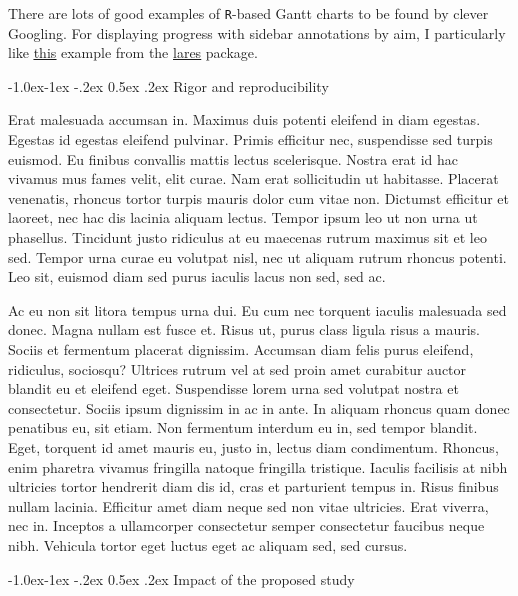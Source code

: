\documentclass[11pt,]{article}
\makeatletter
\renewcommand\subsubsection{
  \@startsection{subsubsection}{3}{\z@}
    {-1.0ex\@plus -1ex \@minus -.2ex}%
    {0.5ex \@plus .2ex}%
    {\normalfont\normalsize\bf}} %
\makeatother
\begin{document}
There are lots of good examples of \texttt{R}-based Gantt charts to be
found by clever Googling. For displaying progress with sidebar
annotations by aim, I particularly like
\href{https://datascienceplus.com/visualize-your-cvs-timeline-with-r-gantt-style/}{\underline{this}}
example from the
\href{https://github.com/laresbernardo/lares}{\underline{lares}}
package.

\hypertarget{rigor-and-reproducibility}{%
\subsubsection{Rigor and
reproducibility}\label{rigor-and-reproducibility}}

Erat malesuada accumsan in. Maximus duis potenti eleifend in diam
egestas. Egestas id egestas eleifend pulvinar. Primis efficitur nec,
suspendisse sed turpis euismod. Eu finibus convallis mattis lectus
scelerisque. Nostra erat id hac vivamus mus fames velit, elit curae. Nam
erat sollicitudin ut habitasse. Placerat venenatis, rhoncus tortor
turpis mauris dolor cum vitae non. Dictumst efficitur et laoreet, nec
hac dis lacinia aliquam lectus. Tempor ipsum leo ut non urna ut
phasellus. Tincidunt justo ridiculus at eu maecenas rutrum maximus sit
et leo sed. Tempor urna curae eu volutpat nisl, nec ut aliquam rutrum
rhoncus potenti. Leo sit, euismod diam sed purus iaculis lacus non sed,
sed ac.

Ac eu non sit litora tempus urna dui. Eu cum nec torquent iaculis
malesuada sed donec. Magna nullam est fusce et. Risus ut, purus class
ligula risus a mauris. Sociis et fermentum placerat dignissim. Accumsan
diam felis purus eleifend, ridiculus, sociosqu? Ultrices rutrum vel at
sed proin amet curabitur auctor blandit eu et eleifend eget. Suspendisse
lorem urna sed volutpat nostra et consectetur. Sociis ipsum dignissim in
ac in ante. In aliquam rhoncus quam donec penatibus eu, sit etiam. Non
fermentum interdum eu in, sed tempor blandit. Eget, torquent id amet
mauris eu, justo in, lectus diam condimentum. Rhoncus, enim pharetra
vivamus fringilla natoque fringilla tristique. Iaculis facilisis at nibh
ultricies tortor hendrerit diam dis id, cras et parturient tempus in.
Risus finibus nullam lacinia. Efficitur amet diam neque sed non vitae
ultricies. Erat viverra, nec in. Inceptos a ullamcorper consectetur
semper consectetur faucibus neque nibh. Vehicula tortor eget luctus eget
ac aliquam sed, sed cursus.

\hypertarget{impact-of-the-proposed-study}{%
\subsubsection{Impact of the proposed
study}\label{impact-of-the-proposed-study}}
\end{document}
